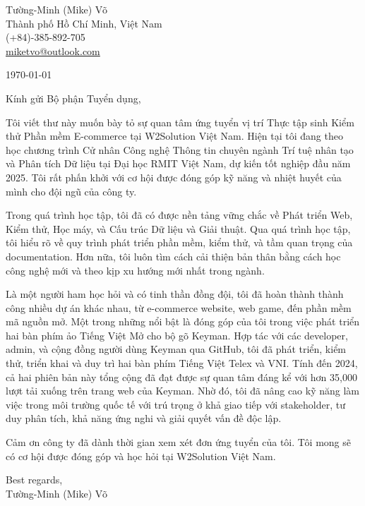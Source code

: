 \documentclass[a4paper,11pt]{article}
\makeatletter
\newcommand{\header}{
    \small{
        Tường-Minh (Mike) Võ\\
        Thành phố Hồ Chí Minh, Việt Nam\\
        (+84)-385-892-705\\
        \href{miketvo@outlook.com}{miketvo@outlook.com}
    }
    \par\noindent\hrulefill
}
\newcommand{\p}[1]{#1\\\vspace{6pt}}
\makeatother
\begin{document}
\header

\p{\today}

\p{Kính gửi Bộ phận Tuyển dụng,}

\p{Tôi viết thư này muốn bày tỏ sự quan tâm ứng tuyển vị trí Thực tập sinh Kiểm thử Phần mềm E-commerce tại W2Solution Việt Nam. Hiện tại tôi đang theo học chương trình Cử nhân Công nghệ Thông tin chuyên ngành Trí tuệ nhân tạo và Phân tích Dữ liệu tại Đại học RMIT Việt Nam, dự kiến tốt nghiệp đầu năm 2025. Tôi rất phấn khởi với cơ hội được đóng góp kỹ năng và nhiệt huyết của mình cho đội ngũ của công ty.}

\p{Trong quá trình học tập, tôi đã có được nền tảng vững chắc về Phát triển Web, Kiểm thử, Học máy, và Cấu trúc Dữ liệu và Giải thuật. Qua quá trình học tập, tôi hiểu rõ về quy trình phát triển phần mềm, kiểm thử, và tầm quan trọng của documentation. Hơn nữa, tôi luôn tìm cách cải thiện bản thân bằng cách học công nghệ mới và theo kịp xu hướng mới nhất trong ngành.}

\p{Là một người ham học hỏi và có tinh thần đồng đội, tôi đã hoàn thành thành công nhiều dự án khác nhau, từ e-commerce website, web game, đến phần mềm mã nguồn mở. Một trong những nổi bật là đóng góp của tôi trong việc phát triển hai bàn phím ảo Tiếng Việt Mở cho bộ gõ Keyman. Hợp tác với các developer, admin, và cộng đồng người dùng Keyman qua GitHub, tôi đã phát triển, kiểm thử, triển khai và duy trì hai bàn phím Tiếng Việt Telex và VNI. Tính đến 2024, cả hai phiên bản này tổng cộng đã đạt được sự quan tâm đáng kể với hơn 35,000 lượt tải xuống trên trang web của Keyman. Nhờ đó, tôi đã nâng cao kỹ năng làm việc trong môi trường quốc tế với trú trọng ở khả giao tiếp với stakeholder, tư duy phân tích, khả năng ứng nghi và giải quyết vấn đề độc lập.}

\p{Cảm ơn công ty đã dành thời gian xem xét đơn ứng tuyển của tôi. Tôi mong sẽ có cơ hội được đóng góp và học hỏi tại W2Solution Việt Nam.}

\p{Best regards,\\
Tường-Minh (Mike) Võ}
\end{document}
